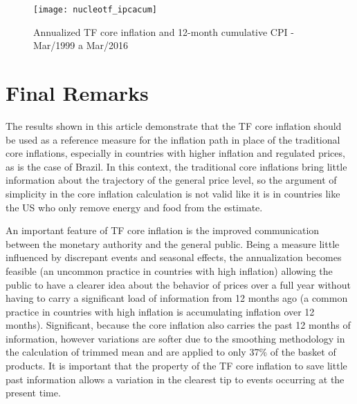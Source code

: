 \documentclass[10pt]{article}
\begin{document}
\begin{figure}[h]
  \centering
  \texttt{[image: nucleotf\_ipcacum]}
  \caption{Annualized TF core inflation and 12-month cumulative CPI - Mar/1999 a Mar/2016}
  \label{nucleotf_ipcacum}
\end{figure}

\clearpage

\section{Final Remarks}\label{consid}

The results shown in this article demonstrate that the TF core inflation should be used as a reference measure for the inflation path in place of the traditional core inflations, especially in countries with higher inflation and regulated prices, as is the case of Brazil. In this context, the traditional core inflations bring little information about the trajectory of the general price level, so the argument of simplicity in the core inflation calculation is not valid like it is in countries like the US who only remove energy and food from the estimate.


An important feature of TF core inflation is the improved communication between the monetary authority and the general public. Being a measure little influenced by discrepant events and seasonal effects, the annualization becomes feasible (an uncommon practice in countries with high inflation) allowing the public to have a clearer idea about the behavior of prices over a full year without having to carry a significant load of information from 12 months ago (a common practice in countries with high inflation is accumulating inflation over 12 months). Significant, because the core inflation also carries the past 12 months of information, however variations are softer due to the smoothing methodology in the calculation of trimmed mean and are applied to only 37\% of the basket of products. It is important that the property of the TF core inflation to save little past information allows a variation in the clearest tip to events occurring at the present time.
\end{document}
